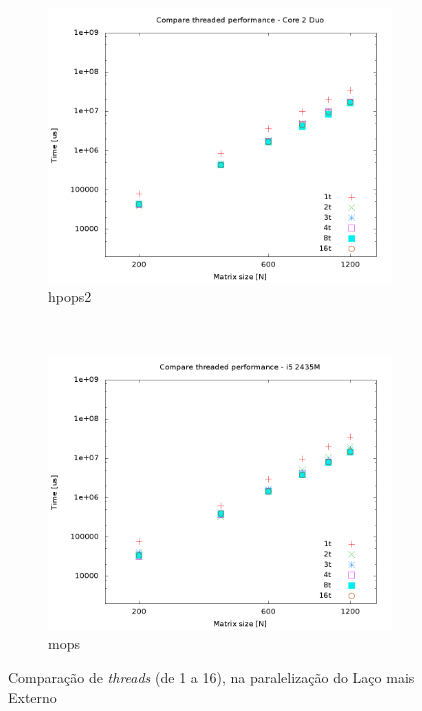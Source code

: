 \documentclass[a4paper, 12pt]{article}
\begin{document}
\begin{figure}[H]
\begin{subfigure}[H]{0.5\textwidth}
        \label{fig:hpops2_O3_par_threads}
    \end{subfigure}
    ~ %
    \begin{subfigure}[H]{0.5\textwidth}
        \includegraphics[width=\textwidth]{hpops2_par_threads}
        \caption{hpops2}
        \label{fig:hpops2_par_threads}
    \end{subfigure}%
    ~ %
    \begin{subfigure}[H]{0.5\textwidth}
        \includegraphics[width=\textwidth]{mops_par_threads}
        \caption{mops}
        \label{fig:mops_par_threads}
    \end{subfigure}
    \caption{Comparação de \textit{threads} (de 1 a 16), na paralelização do Laço mais Externo}\label{fig:animals}
\end{figure}
\end{document}

